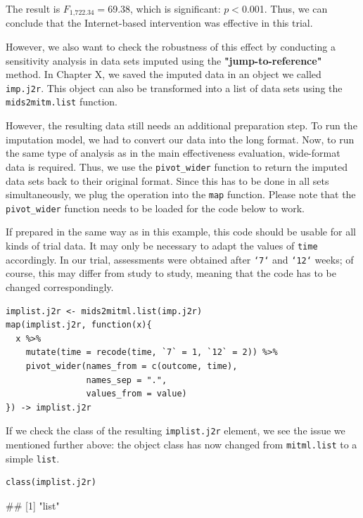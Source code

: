 The result is $F_{\text{1,722.34}}=$69.38, which is significant: $p<$0.001. Thus, we can conclude that the Internet-based intervention was effective in this trial. 

However, we also want to check the robustness of this effect by conducting a sensitivity analysis in data sets imputed using the \textbf{"jump-to-reference"} method. In Chapter X, we saved the imputed data in an object we called \texttt{imp.j2r}. This object can also be transformed into a list of data sets using the \texttt{mids2mitm.list} function. 

However, the resulting data still needs an additional preparation step. To run the imputation model, we had to convert our data into the long format. Now, to run the same type of analysis as in the main effectiveness evaluation, wide-format data is required. Thus, we use the \texttt{pivot\_wider} function to return the imputed data sets back to their original format. Since this has to be done in all sets simultaneously, we plug the operation into the \texttt{map} function. Please note that the \texttt{pivot\_wider} function needs to be loaded for the code below to work. 

If prepared in the same way as in this example, this code should be usable for all kinds of trial data. It may only be necessary to adapt the values of \texttt{time} accordingly. In our trial, assessments were obtained after \texttt{`7`} and \texttt{`12`} weeks; of course, this may differ from study to study, meaning that the code has to be changed correspondingly.

\begin{lstlisting}
implist.j2r <- mids2mitml.list(imp.j2r)
map(implist.j2r, function(x){
  x %>% 
    mutate(time = recode(time, `7` = 1, `12` = 2)) %>% 
    pivot_wider(names_from = c(outcome, time),
                names_sep = ".",
                values_from = value)
}) -> implist.j2r
\end{lstlisting}

If we check the class of the resulting \texttt{implist.j2r} element, we see the issue we mentioned further above: the object class has now changed from \texttt{mitml.list} to a simple \texttt{list}. 

\begin{lstlisting}
class(implist.j2r)
\end{lstlisting}

\begin{example}
## [1] "list"
\end{example}

